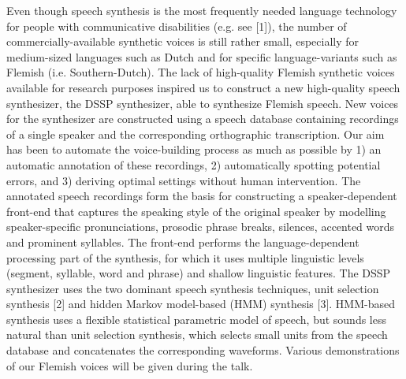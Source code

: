 \documentclass[10pt, a4paper, twopage, headinclude, footinclude, BCOR5mm]{scrartcl}
\begin{document}
        \begin{table}[t!]
    \end{table}
        \begin{table}[t!]
    \end{table}

\noindent
Even though speech synthesis is the most frequently needed language technology for people with communicative disabilities (e.g. see [1]), the number of commercially-available synthetic voices is still rather small, especially for medium-sized languages such as Dutch and for specific language-variants such as Flemish (i.e. Southern-Dutch). The lack of high-quality Flemish synthetic voices available for research purposes inspired us to construct a new high-quality speech synthesizer, the DSSP synthesizer, able to synthesize Flemish speech. New voices for the synthesizer are constructed using a speech database containing recordings of a single speaker and the corresponding orthographic transcription. Our aim has been to automate the voice-building process as much as possible by 1) an automatic annotation of these recordings, 2) automatically spotting potential errors, and 3) deriving optimal settings without human intervention. The annotated speech recordings form the basis for constructing a speaker-dependent front-end that captures the speaking style of the original speaker by modelling speaker-specific pronunciations, prosodic phrase breaks, silences, accented words and prominent syllables. The front-end performs the language-dependent processing part of the synthesis, for which it uses multiple linguistic levels (segment, syllable, word and phrase) and shallow linguistic features. The DSSP synthesizer uses the two dominant speech synthesis techniques, unit selection synthesis [2] and hidden Markov model-based (HMM) synthesis [3]. HMM-based synthesis uses a flexible statistical parametric model of speech, but sounds less natural than unit selection synthesis, which selects small units from the speech database and concatenates the corresponding waveforms. Various demonstrations of our Flemish voices will be given during the talk.
\end{document}
